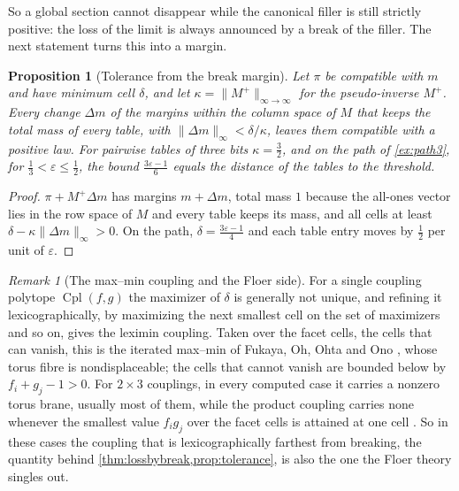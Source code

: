 \documentclass[11pt]{article}
\newtheorem{proposition}[theorem]{Proposition}
\theoremstyle{definition}
\theoremstyle{remark}
\newtheorem{remark}[theorem]{Remark}
\newcommand{\Cpl}{\operatorname{Cpl}}
\begin{document}
So a global section cannot disappear while the canonical filler is still strictly positive: the loss of the limit is always announced
by a break of the filler. The next statement turns this into a margin.

\begin{proposition}[Tolerance from the break margin]\label{prop:tolerance}
Let $\pi$ be compatible with $m$ and have minimum cell $\delta$, and let $\kappa=\lVert M^+\rVert_{\infty\to\infty}$ for the pseudo-inverse
$M^+$. Every change $\Delta m$ of the margins within the column space of $M$ that keeps the total mass of every table, with $\lVert\Delta m\rVert_\infty<\delta/\kappa$, leaves
them compatible with a positive law. For pairwise tables of three bits $\kappa=\frac32$, and on the path of \cref{ex:path3}, for $\frac13<\varepsilon\le\frac12$, the bound
$\frac{3\varepsilon-1}6$ equals the distance of the tables to the threshold.
\end{proposition}
\begin{proof}
$\pi+M^+\Delta m$ has margins $m+\Delta m$, total mass $1$ because the all-ones vector lies in the row space of $M$ and every table keeps its
mass, and all cells at least
$\delta-\kappa\lVert\Delta m\rVert_\infty>0$. On the path, $\delta=\frac{3\varepsilon-1}4$ and each table entry moves by $\frac12$ per unit of $\varepsilon$.
\end{proof}

\begin{remark}[The max--min coupling and the Floer side]\label{rem:leximin}
For a single coupling polytope $\Cpl(f,g)$ the maximizer of $\delta$ is generally not unique, and refining it lexicographically, by maximizing
the next smallest cell on the set of maximizers and so on, gives the leximin coupling. Taken over the facet cells, the cells that can vanish, this is
the iterated max--min of Fukaya, Oh, Ohta and Ono \cite[Thm.~1.5]{FOOO2010}, whose torus fibre is nondisplaceable; the cells that cannot vanish
are bounded below by $f_i+g_j-1>0$. For $2\times3$ couplings, in every computed case it carries a nonzero torus brane, usually most of them, while
the product coupling carries none whenever the smallest value $f_ig_j$ over the facet cells is attained at one cell \cite[Thm.~8.2]{Bridges}. So in these cases the coupling that is
lexicographically farthest from breaking, the quantity behind \cref{thm:lossbybreak,prop:tolerance}, is also the one the Floer theory singles out.
\end{remark}
\end{document}
